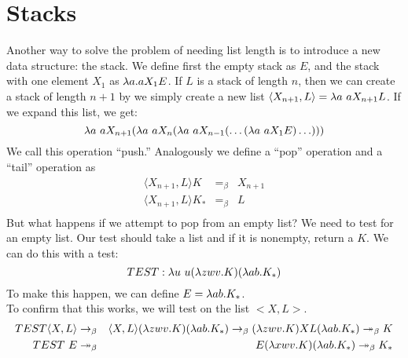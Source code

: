 \section{Stacks}
Another way to solve the problem of needing list length is to introduce a new data structure: the stack. We define first the empty stack as $E$, and the stack with one element $X_1$ as $\lambda a . a X_1 E$. If $L$ is a stack of length $n$, then we can create a stack of length $n + 1$ by we simply create a new list $\langle X_{n+1},L\rangle  = \lambda a\ aX_{n+1}L$. If we expand this list, we get:
\begin{equation*}
  \l a\ aX_{n+1}(\l a\ aX_n(\l a\ aX_{n-1}(\ldots(\l a\ aX_1E)\ldots)))
\end{equation*}
We call this operation ``push.'' Analogously we define a ``pop'' operation and a ``tail'' operation as
\begin{eqnarray*}
  \langle X_{n+1},L \rangle K &=_\beta& X_{n+1}\\
  \langle X_{n+1},L \rangle K_* &=_\beta& L\\
\end{eqnarray*}
But what happens if we attempt to pop from an empty list? We need to test for an empty list. Our test should take a list and if it is nonempty, return a $K$. We can do this with a test:
\begin{equation*}
  TEST: \l u\ u(\l zwv.K)(\l ab.K_*)
\end{equation*}
To make this happen, we can define $E = \lambda ab.K_*$.\\

To confirm that this works, we will test on the list $<X,L>$.
\begin{eqnarray*}
  TEST\langle X,L\rangle &\rightarrow_\beta& \langle X,L\rangle (\lambda zwv.K)(\lambda ab.K_*) \rightarrow_\beta (\lambda zwv.K)XL(\lambda ab.K_*) \twoheadrightarrow_\beta K\\
  TEST\ E &\twoheadrightarrow_\beta& E(\lambda xwv.K)(\lambda ab.K_*) \twoheadrightarrow_\beta K_*\\
\end{eqnarray*}

